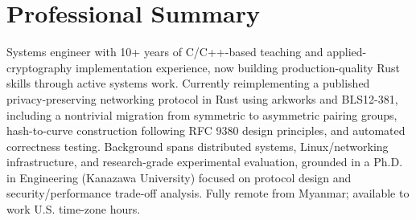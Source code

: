 \section{Professional Summary}
Systems engineer with 10+ years of C/C++-based teaching and applied-cryptography implementation experience, now building production-quality Rust skills through active systems work. Currently reimplementing a published privacy-preserving networking protocol in Rust using arkworks and BLS12-381, including a nontrivial migration from symmetric to asymmetric pairing groups, hash-to-curve construction following RFC 9380 design principles, and automated correctness testing. Background spans distributed systems, Linux/networking infrastructure, and research-grade experimental evaluation, grounded in a Ph.D. in Engineering (Kanazawa University) focused on protocol design and security/performance trade-off analysis. Fully remote from Myanmar; available to work U.S. time-zone hours.
